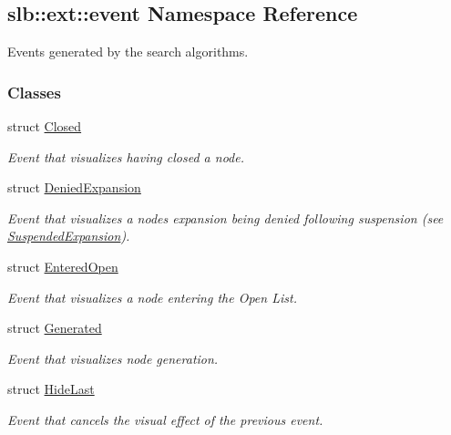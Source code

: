 \hypertarget{namespaceslb_1_1ext_1_1event}{}\subsection{slb\+:\+:ext\+:\+:event Namespace Reference}
\label{namespaceslb_1_1ext_1_1event}


Events generated by the search algorithms.  


\subsubsection*{Classes}
\begin{DoxyCompactItemize}
\item 
struct \hyperlink{structslb_1_1ext_1_1event_1_1Closed}{Closed}
\begin{DoxyCompactList}\small\item\em Event that visualizes having closed a node. \end{DoxyCompactList}\item 
struct \hyperlink{structslb_1_1ext_1_1event_1_1DeniedExpansion}{Denied\+Expansion}
\begin{DoxyCompactList}\small\item\em Event that visualizes a node\textquotesingle{}s expansion being denied following suspension (see \hyperlink{structslb_1_1ext_1_1event_1_1SuspendedExpansion}{Suspended\+Expansion}). \end{DoxyCompactList}\item 
struct \hyperlink{structslb_1_1ext_1_1event_1_1EnteredOpen}{Entered\+Open}
\begin{DoxyCompactList}\small\item\em Event that visualizes a node entering the Open List. \end{DoxyCompactList}\item 
struct \hyperlink{structslb_1_1ext_1_1event_1_1Generated}{Generated}
\begin{DoxyCompactList}\small\item\em Event that visualizes node generation. \end{DoxyCompactList}\item 
struct \hyperlink{structslb_1_1ext_1_1event_1_1HideLast}{Hide\+Last}
\begin{DoxyCompactList}\small\item\em Event that cancels the visual effect of the previous event. \end{DoxyCompactList}\item 

\end{DoxyCompactItemize}
